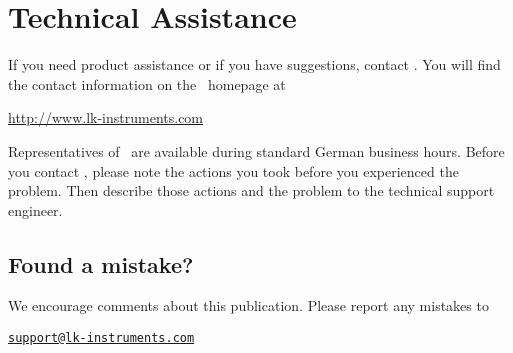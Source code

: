 \thispagestyle{empty}
\section*{Technical Assistance}
If you need product assistance or if you have suggestions, contact \docAuthor.
You will find the contact information on the \docAuthor~homepage at
\begin{center}
  \url{http://www.lk-instruments.com}
\end{center}
Representatives of \docAuthor~are available during standard German business hours.
Before you contact \docAuthor, please note the actions you took before you experienced
the problem. Then describe those actions and the problem to the technical support
engineer.

\subsection*{Found a mistake?}
We encourage comments about this publication. Please report any mistakes
to
\begin{center}
  \href{mailto:support@lk-instruments.com}{\nolinkurl{support@lk-instruments.com}}
\end{center}






\newpage